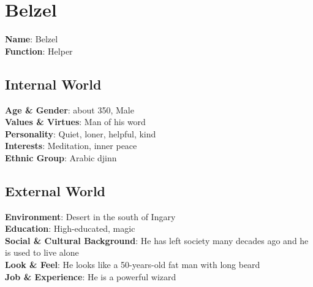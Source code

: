 \section{Belzel}


\begin{minipage}{0.5\textwidth}
\textbf{Name}: Belzel \\
\textbf{Function}: Helper

\subsection{Internal World}

\textbf{Age \& Gender}: about 350, Male \\
\textbf{Values \& Virtues}: Man of his word  \\
\textbf{Personality}: Quiet, loner, helpful, kind \\
\textbf{Interests}: Meditation, inner peace \\
\textbf{Ethnic Group}: Arabic djinn

\subsection{External World}
\textbf{Environment}: Desert in the south of Ingary  \\
\textbf{Education}: High-educated, magic \\
\textbf{Social \& Cultural Background}: He has left society many decades ago and he is used to live alone \\
\textbf{Look \& Feel}: He looks like a 50-years-old fat man with long beard \\
\textbf{Job \& Experience}: He is a powerful wizard \\

\end{minipage}%
%

